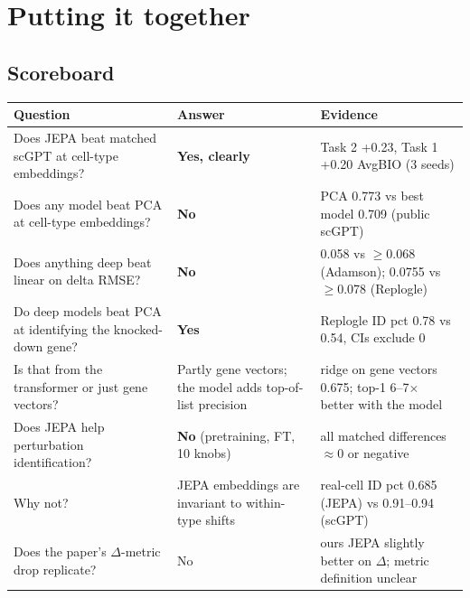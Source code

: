 \documentclass[11pt]{article}
\begin{document}
\section{Putting it together}

\subsection{Scoreboard}
\begin{center}\small
\begin{tabularx}{\linewidth}{>{\raggedright\arraybackslash}p{4.3cm}>{\raggedright\arraybackslash}p{3.4cm}X}
\toprule
Question & Answer & Evidence\\
\midrule
Does JEPA beat matched scGPT at cell-type embeddings? & \textbf{Yes, clearly} & Task 2 +0.23, Task 1 +0.20 AvgBIO (3 seeds)\\
Does any model beat PCA at cell-type embeddings? & \textbf{No} & PCA 0.773 vs best model 0.709 (public scGPT)\\
Does anything deep beat linear on delta RMSE? & \textbf{No} & 0.058 vs $\ge$0.068 (Adamson); 0.0755 vs $\ge$0.078 (Replogle)\\
Do deep models beat PCA at identifying the knocked-down gene? & \textbf{Yes} & Replogle ID pct 0.78 vs 0.54, CIs exclude 0\\
Is that from the transformer or just gene vectors? & Partly gene vectors; the model adds top-of-list precision & ridge on gene vectors 0.675; top-1 6--7$\times$ better with the model\\
Does JEPA help perturbation identification? & \textbf{No} (pretraining, FT, 10 knobs) & all matched differences $\approx$0 or negative\\
Why not? & JEPA embeddings are invariant to within-type shifts & real-cell ID pct 0.685 (JEPA) vs 0.91--0.94 (scGPT)\\
Does the paper's $\Delta$-metric drop replicate? & No & ours JEPA slightly better on $\Delta$; metric definition unclear\\
\bottomrule
\end{tabularx}
\end{center}
\end{document}
